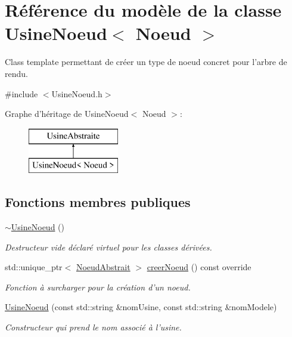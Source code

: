 \hypertarget{class_usine_noeud}{\section{Référence du modèle de la classe Usine\-Noeud$<$ Noeud $>$}
\label{class_usine_noeud}
}


Class template permettant de créer un type de noeud concret pour l'arbre de rendu.  




{\ttfamily \#include $<$Usine\-Noeud.\-h$>$}

Graphe d'héritage de Usine\-Noeud$<$ Noeud $>$\-:\begin{figure}[H]
\begin{center}
\leavevmode
\includegraphics[height=2.000000cm]{class_usine_noeud}
\end{center}
\end{figure}
\subsection*{Fonctions membres publiques}
\begin{DoxyCompactItemize}
\item 
\hypertarget{class_usine_noeud_ad09d79d36fb0135b51224484ca0f47f0}{\hyperlink{class_usine_noeud_ad09d79d36fb0135b51224484ca0f47f0}{$\sim$\-Usine\-Noeud} ()}\label{class_usine_noeud_ad09d79d36fb0135b51224484ca0f47f0}

\begin{DoxyCompactList}\small\item\em Destructeur vide déclaré virtuel pour les classes dérivées. \end{DoxyCompactList}\item 
std\-::unique\-\_\-ptr$<$ \hyperlink{class_noeud_abstrait}{Noeud\-Abstrait} $>$ \hyperlink{group__inf2990_gaefabfaab4efcf2d2e910cff0246d4735}{creer\-Noeud} () const override
\begin{DoxyCompactList}\small\item\em Fonction à surcharger pour la création d'un noeud. \end{DoxyCompactList}\item 
\hypertarget{class_usine_noeud_a14ce73da1a318f53746607658837c56a}{\hyperlink{class_usine_noeud_a14ce73da1a318f53746607658837c56a}{Usine\-Noeud} (const std\-::string \&nom\-Usine, const std\-::string \&nom\-Modele)}\label{class_usine_noeud_a14ce73da1a318f53746607658837c56a}

\begin{DoxyCompactList}\small\item\em Constructeur qui prend le nom associé à l'usine. \end{DoxyCompactList}\end{DoxyCompactItemize}
